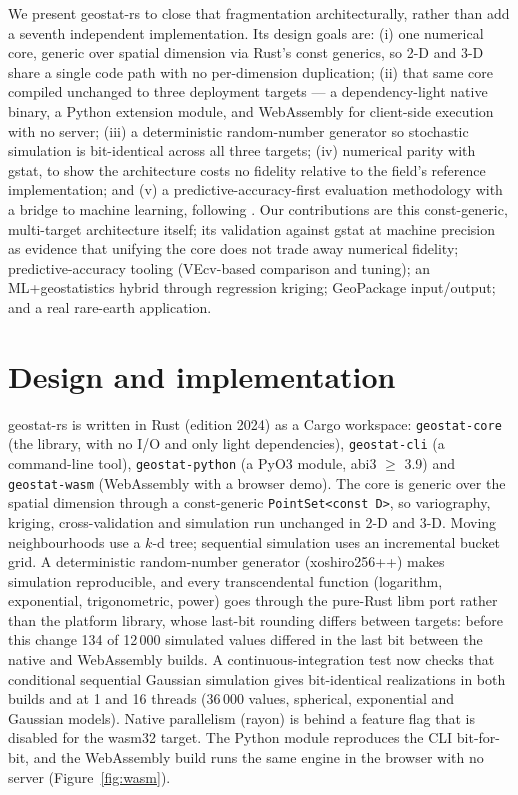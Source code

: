 \documentclass[preprint,12pt,authoryear]{elsarticle}
\begin{document}
We present geostat-rs to close that fragmentation architecturally, rather than
add a seventh independent implementation. Its design goals are: (i) one
numerical core, generic over spatial dimension via Rust's const generics, so
2-D and 3-D share a single code path with no per-dimension duplication;
(ii) that same core compiled unchanged to three deployment targets --- a
dependency-light native binary, a Python extension module, and WebAssembly for
client-side execution with no server; (iii) a deterministic random-number
generator so stochastic simulation is bit-identical across all three targets;
(iv) numerical parity with gstat, to show the architecture costs no fidelity
relative to the field's reference implementation; and (v) a
predictive-accuracy-first evaluation methodology with a bridge to machine
learning, following \citet{li2021}. Our contributions are this const-generic,
multi-target architecture itself; its validation against gstat at machine
precision as evidence that unifying the core does not trade away numerical
fidelity; predictive-accuracy tooling (VEcv-based comparison and tuning); an
ML+geostatistics hybrid through regression kriging; GeoPackage input/output;
and a real rare-earth application.

\section{Design and implementation}
\label{sec:design}

geostat-rs is written in Rust (edition 2024) as a Cargo workspace:
\texttt{geostat-core} (the library, with no I/O and only light dependencies),
\texttt{geostat-cli} (a command-line tool), \texttt{geostat-python} (a PyO3
module, abi3 $\geq$ 3.9) and \texttt{geostat-wasm} (WebAssembly with a browser
demo). The core is generic over the spatial dimension through a const-generic
\texttt{PointSet<const D>}, so variography, kriging, cross-validation and
simulation run unchanged in 2-D and 3-D. Moving neighbourhoods use a $k$-d tree;
sequential simulation uses an incremental bucket grid. A deterministic
random-number generator (xoshiro256++) makes simulation reproducible, and
every transcendental function (logarithm, exponential, trigonometric, power)
goes through the pure-Rust libm port rather than the platform library, whose
last-bit rounding differs between targets: before this change 134 of 12\,000
simulated values differed in the last bit between the native and WebAssembly
builds. A continuous-integration test now checks that conditional sequential
Gaussian simulation gives bit-identical realizations in both builds and at 1 and
16 threads (36\,000 values, spherical, exponential and Gaussian models).
Native parallelism (rayon) is behind a feature flag that is disabled for the
wasm32 target. The
Python module reproduces the CLI bit-for-bit, and the WebAssembly build runs
the same engine in the browser with no server (Figure~\ref{fig:wasm}).
\end{document}
